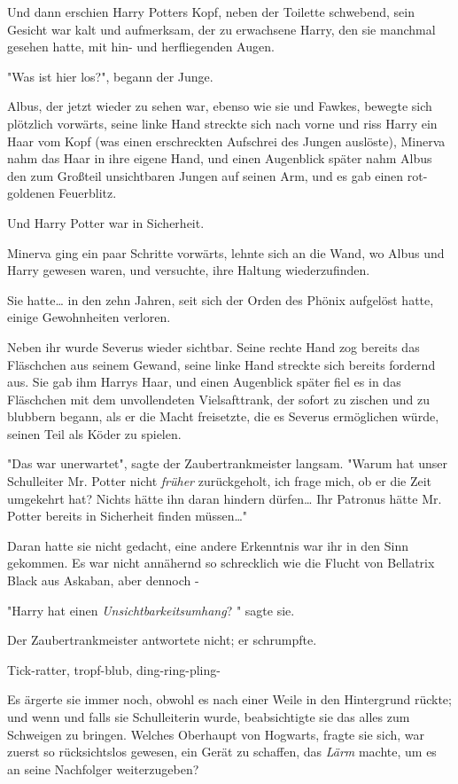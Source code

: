 {Und dann erschien Harry Potters Kopf, neben der Toilette schwebend, sein Gesicht war kalt und aufmerksam, der zu erwachsene Harry, den sie manchmal gesehen hatte, mit hin- und herfliegenden Augen.

"Was ist hier los?", begann der Junge.

Albus, der jetzt wieder zu sehen war, ebenso wie sie und Fawkes, bewegte sich plötzlich vorwärts, seine linke Hand streckte sich nach vorne und riss Harry ein Haar vom Kopf (was einen erschreckten Aufschrei des Jungen auslöste), Minerva nahm das Haar in ihre eigene Hand, und einen Augenblick später nahm Albus den zum Großteil unsichtbaren Jungen auf seinen Arm, und es gab einen rot-goldenen Feuerblitz.

Und Harry Potter war in Sicherheit.

Minerva ging ein paar Schritte vorwärts, lehnte sich an die Wand, wo Albus und Harry gewesen waren, und versuchte, ihre Haltung wiederzufinden.

Sie hatte… in den zehn Jahren, seit sich der Orden des Phönix aufgelöst hatte, einige Gewohnheiten verloren.

Neben ihr wurde Severus wieder sichtbar. Seine rechte Hand zog bereits das Fläschchen aus seinem Gewand, seine linke Hand streckte sich bereits fordernd aus. Sie gab ihm Harrys Haar, und einen Augenblick später fiel es in das Fläschchen mit dem unvollendeten Vielsafttrank, der sofort zu zischen und zu blubbern begann, als er die Macht freisetzte, die es Severus ermöglichen würde, seinen Teil als Köder zu spielen.

"Das war unerwartet", sagte der Zaubertrankmeister langsam. "Warum hat unser Schulleiter Mr. Potter nicht \emph{früher} zurückgeholt, ich frage mich, ob er die Zeit umgekehrt hat? Nichts hätte ihn daran hindern dürfen… Ihr Patronus hätte Mr. Potter bereits in Sicherheit finden müssen…"

Daran hatte sie nicht gedacht, eine andere Erkenntnis war ihr in den Sinn gekommen. Es war nicht annähernd so schrecklich wie die Flucht von Bellatrix Black aus Askaban, aber dennoch -

"Harry hat einen \emph{Unsichtbarkeitsumhang}? " sagte sie.

Der Zaubertrankmeister antwortete nicht; er schrumpfte.

Tick-ratter, tropf-blub, ding-ring-pling-

Es ärgerte sie immer noch, obwohl es nach einer Weile in den Hintergrund rückte; und wenn und falls sie Schulleiterin wurde, beabsichtigte sie das alles zum Schweigen zu bringen. Welches Oberhaupt von Hogwarts, fragte sie sich, war zuerst so rücksichtslos gewesen, ein Gerät zu schaffen, das \emph{Lärm} machte, um es an seine Nachfolger weiterzugeben?

}
